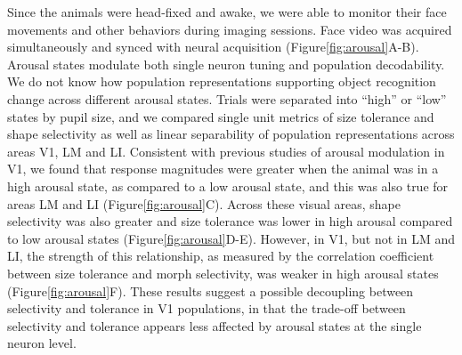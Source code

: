Since the animals were head-fixed and awake, we were able to monitor their face movements and other behaviors during imaging sessions. Face video was acquired simultaneously and synced with neural acquisition (Figure\ref{fig:arousal}A-B). Arousal states modulate both single neuron tuning and population decodability. We do not know how population representations supporting object recognition change across different arousal states. Trials were separated into ``high'' or ``low'' states by pupil size, and we compared single unit metrics of size tolerance and shape selectivity as well as linear separability of population representations across areas V1, LM and LI. Consistent with previous studies of arousal modulation in V1, we found that response magnitudes were greater when the animal was in a high arousal state, as compared to a low arousal state, and this was also true for areas LM and LI (Figure\ref{fig:arousal}C). Across these visual areas, shape selectivity was also greater and size tolerance was lower in high arousal compared to low arousal states (Figure\ref{fig:arousal}D-E). However, in V1, but not in LM and LI, the strength of this relationship, as measured by the correlation coefficient between size tolerance and morph selectivity, was weaker in high arousal states (Figure\ref{fig:arousal}F). These results suggest a possible decoupling between selectivity and tolerance in V1 populations, in that the trade-off between selectivity and tolerance appears less affected by arousal states at the single neuron level.


